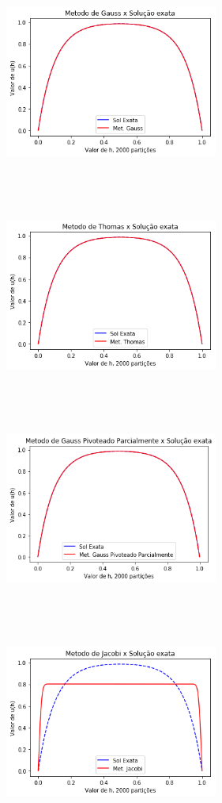\documentclass{article}
\begin{document}
\begin{itemize}
\begin{figure}[!htb]
\includegraphics[width=7cm,height=7cm]{G2000part.png}
\includegraphics [width=7cm,height=7cm]{T2000part}
\includegraphics [width=7cm,height=7cm]{GP2000part.png}
\includegraphics [width=7cm,height=7cm]{J2000part.png}
\end{figure}


\end{itemize}
\end{document}
